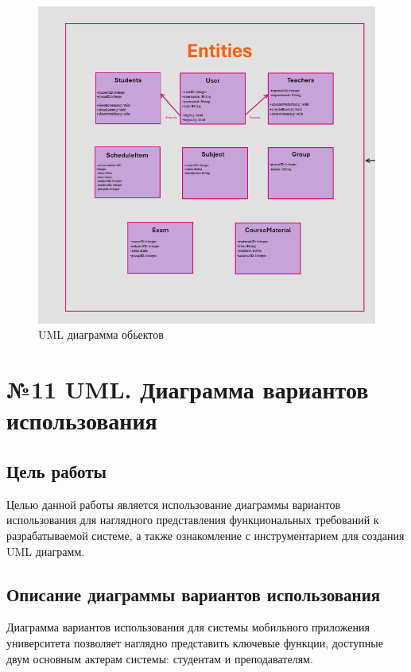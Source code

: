 \documentclass[a4paper,12pt]{article}
\begin{document}
\begin{figure}[-h]
    \centering
    \includegraphics[width=0.5\linewidth]{UML_Obj.png}
    \caption{UML диаграмма обьектов}
\end{figure}

\section{№11 UML. Диаграмма вариантов использования}

\subsection{Цель работы}
Целью данной работы является использование диаграммы вариантов использования для наглядного представления функциональных требований к разрабатываемой системе, а также ознакомление с инструментарием для создания UML диаграмм.

\subsection{Описание диаграммы вариантов использования}
Диаграмма вариантов использования для системы мобильного приложения университета позволяет наглядно представить ключевые функции, доступные двум основным актерам системы: студентам и преподавателям.
\end{document}
